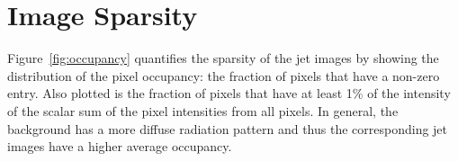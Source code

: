 \documentclass{article}
\begin{document}
%
%
%
%
%
%
%



%

%








\appendix

\section{Image Sparsity}
\label{sec:sparsity}

Figure~\ref{fig:occupancy} quantifies the sparsity of the jet images by showing the distribution of the pixel occupancy: the fraction of pixels that have a non-zero entry.  Also plotted is the fraction of pixels that have at least 1\% of the intensity of the scalar sum of the pixel intensities from all pixels.  In general, the background has a more diffuse radiation pattern and thus the corresponding jet images have a higher average occupancy.
\end{document}
